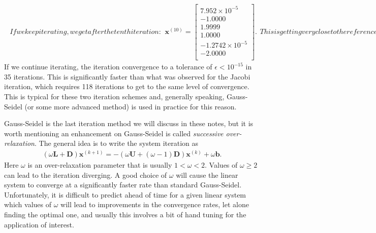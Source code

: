 \begin{subequations}
\begin{align}
\end{align}
If we keep iterating, we get after the tenth iteration:
\begin{align}
\mathbf{x}^{(10)} =
  \left[ \begin{array}{c} 7.952 \times 10^{-5}  \\ -1.0000 \\ 1.9999 \\ 1.0000  \\ -1.2742 \times 10^{-5} \\ -2.0000 \\ \end{array} \right].
\end{align}
This is getting very close to the reference solution (only four digits of precision are displayed, so the error is less than that), which is, again,
\begin{align}
  \mathbf{x} = \left[ \begin{array}{r} 0 \\ -1 \\ 2 \\ 1 \\ 0 \\  -2 \\ \end{array} \right] .
\end{align}            
\end{subequations}
If we continue iterating, the iteration convergence to a tolerance of $\epsilon < 10^{-15}$ in 35 iterations. This is significantly faster than what was observed for the Jacobi iteration, which requires 118 iterations to get to the same level of convergence. This is typical for these two iteration schemes and, generally speaking, Gauss-Seidel (or some more advanced method) is used in practice for this reason.

Gauss-Seidel is the last iteration method we will discuss in these notes, but it is worth mentioning an enhancement on Gauss-Seidel is called \emph{successive over-relaxation}. The general idea is to write the system iteration as
\begin{align}
  ( \omega \mathbf{L} + \mathbf{D} ) \mathbf{x}^{(k+1)} = -( \omega \mathbf{U} + (\omega - 1) \mathbf{D} ) \mathbf{x}^{(k)} + \omega \mathbf{b} .
\end{align}
Here $\omega$ is an over-relaxation parameter that is usually $1 < \omega < 2$. Values of $\omega \ge 2$ can lead to the iteration diverging. A good choice of $\omega$ will cause the linear system to converge at a significantly faster rate than standard Gauss-Seidel. Unfortunately, it is difficult to predict ahead of time for a given linear system which values of $\omega$ will lead to improvements in the convergence rates, let alone finding the optimal one, and usually this involves a bit of hand tuning for the application of interest.

